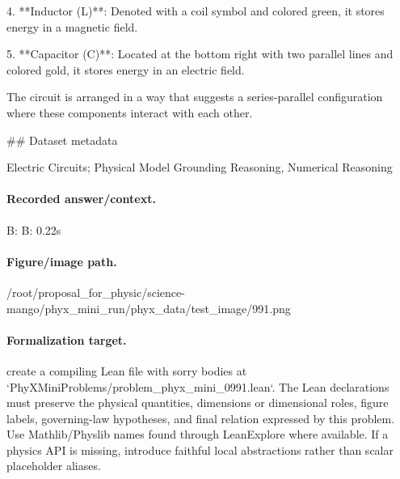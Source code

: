 4. **Inductor (L)**: Denoted with a coil symbol and colored green, it stores energy in a magnetic field.

5. **Capacitor (C)**: Located at the bottom right with two parallel lines and colored gold, it stores energy in an electric field.

The circuit is arranged in a way that suggests a series-parallel configuration where these components interact with each other.

\#\# Dataset metadata

Electric Circuits; Physical Model Grounding Reasoning, Numerical Reasoning

\paragraph{Recorded answer/context.}
B: B: 0.22s

\paragraph{Figure/image path.}
/root/proposal\_for\_physic/science-mango/phyx\_mini\_run/phyx\_data/test\_image/991.png

\paragraph{Formalization target.}
create a compiling Lean file with sorry bodies at `PhyXMiniProblems/problem\_phyx\_mini\_0991.lean`. The Lean declarations must preserve the physical quantities, dimensions or dimensional roles, figure labels, governing-law hypotheses, and final relation expressed by this problem.
Use Mathlib/Physlib names found through LeanExplore where available. If a physics API is missing, introduce faithful local abstractions rather than scalar placeholder aliases.

